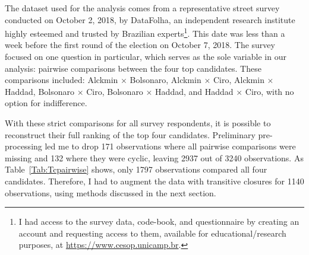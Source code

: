 \documentclass[hidelinks,11pt]{article} \usepackage[utf8]{inputenc}
\begin{document}
The dataset used for the analysis comes from a representative street survey
conducted on October 2, 2018, by DataFolha, an independent research institute
highly esteemed and trusted by Brazilian experts\footnote{I had access to the
  survey data, code-book, and questionnaire by creating an account and
  requesting access to them, available for educational/research purposes,
  at \url{https://www.cesop.unicamp.br}.}. This date was less than a week before
the first round of the election on October 7, 2018. The survey focused on one
question in particular, which serves as the sole variable in our analysis:
pairwise comparisons between the four top candidates. These comparisons
included: Alckmin \(\times\) Bolsonaro, Alckmin \(\times\) Ciro, Alckmin
\(\times\) Haddad, Bolsonaro \(\times\) Ciro, Bolsonaro \(\times\) Haddad, and
Haddad \(\times\) Ciro, with no option for indifference.

With these strict comparisons for all survey respondents, it is possible to
reconstruct their full ranking of the top four candidates. Preliminary
pre-processing led me to drop 171 observations where all pairwise comparisons
were missing and 132 where they were cyclic, leaving 2937 out of 3240
observations. As Table~\ref{Tab:Tcpairwise} shows, only 1797 observations
compared all four candidates. Therefore, I had to augment the data with
transitive closures for 1140 observations, using methods discussed in the next
section.





\end{document}
